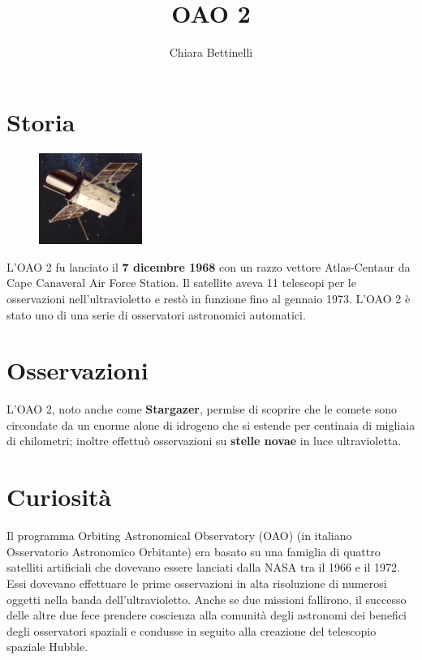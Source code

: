 \documentclass[12pt,a4paper]{article}
\begin{document}
\title{\vspace{-70pt}OAO 2}
\author{Chiara Bettinelli}
\date{}
\maketitle
\pagestyle{empty}
\thispagestyle{empty}

\section*{Storia}
\label{storia}
\begin{figure}
  \vspace{-10pt}
  \begin{center}
    \includegraphics[width=0.30\textwidth]{satellite}
  \end{center}
  \vspace{-20pt}
\end{figure}
L'OAO 2 fu lanciato il \textbf{7 dicembre 1968} con un razzo vettore Atlas-Centaur da Cape Canaveral Air Force Station. Il satellite aveva 11 telescopi per le osservazioni nell'ultravioletto e restò in funzione fino al gennaio 1973. L'OAO 2 è stato uno di una serie di osservatori astronomici automatici.

\section*{Osservazioni}
\label{osservazioni}

L'OAO 2, noto anche come \textbf{Stargazer}, permise di scoprire che le comete sono circondate da un enorme alone di idrogeno che si estende per centinaia di migliaia di chilometri; inoltre effettuò osservazioni su \textbf{stelle novae} in luce ultravioletta.

\section*{Curiosità}
\label{curiosit}

Il programma Orbiting Astronomical Observatory (OAO) (in italiano Osservatorio Astronomico Orbitante) era basato su una famiglia di quattro satelliti artificiali che dovevano essere lanciati dalla NASA tra il 1966 e il 1972. Essi dovevano effettuare le prime osservazioni in alta risoluzione di numerosi oggetti nella banda dell'ultravioletto. Anche se due missioni fallirono, il successo delle altre due fece prendere coscienza alla comunità degli astronomi dei benefici degli osservatori spaziali e condusse in seguito alla creazione del telescopio spaziale Hubble.
\end{document}
